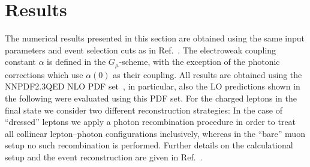 \documentclass[11pt]{cernrep}
\begin{document}
\section{Results}
\label{sec:dyew:results}

The numerical results presented in this section are obtained using the same input parameters and event selection cuts as in Ref.~\cite{Dittmaier:2015rxo}. 
The electroweak coupling constant $\alpha$ is defined in the $G_\mu$-scheme, with the exception of the photonic corrections which use $\alpha(0)$ as their coupling.
All results are obtained using the NNPDF2.3QED NLO PDF set~\cite{Ball:2012cx}, in particular, also the LO predictions shown in the following were evaluated using this PDF set. 
For the charged leptons in the final state we consider two different reconstruction strategies:
In the case of ``dressed'' leptons we apply a photon recombination procedure in order to treat all collinear lepton--photon configurations inclusively, whereas in the ``bare'' muon setup no such recombination is performed. 
Further details on the calculational setup and the event reconstruction are given in Ref.~\cite{Dittmaier:2015rxo}.
\end{document}
